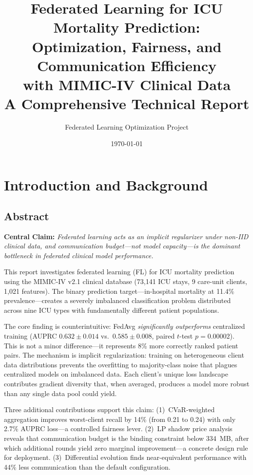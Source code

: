 \documentclass[11pt,a4paper]{report}
\title{\textbf{Federated Learning for ICU Mortality Prediction:\\Optimization, Fairness, and Communication Efficiency\\with MIMIC-IV Clinical Data}\\\vspace{1cm}\large A Comprehensive Technical Report}
\author{Federated Learning Optimization Project}
\date{\today}
\begin{document}
\maketitle
\tableofcontents
\listoffigures
\listoftables

\part{Introduction and Background}

\chapter{Abstract}

\textbf{Central Claim:} \emph{Federated learning acts as an implicit regularizer under non-IID clinical data, and communication budget---not model capacity---is the dominant bottleneck in federated clinical model performance.}

\medskip

This report investigates federated learning (FL) for ICU mortality prediction using the MIMIC-IV v2.1 clinical database (73,141 ICU stays, 9 care-unit clients, 1,021 features). The binary prediction target---in-hospital mortality at 11.4\% prevalence---creates a severely imbalanced classification problem distributed across nine ICU types with fundamentally different patient populations.

The core finding is counterintuitive: FedAvg \emph{significantly outperforms} centralized training (AUPRC $0.632 \pm 0.014$ vs.\ $0.585 \pm 0.008$, paired $t$-test $p = 0.00002$). This is not a minor difference---it represents 8\% more correctly ranked patient pairs. The mechanism is implicit regularization: training on heterogeneous client data distributions prevents the overfitting to majority-class noise that plagues centralized models on imbalanced data. Each client's unique loss landscape contributes gradient diversity that, when averaged, produces a model more robust than any single data pool could yield.

Three additional contributions support this claim: (1)~CVaR-weighted aggregation improves worst-client recall by 14\% (from 0.21 to 0.24) with only 2.7\% AUPRC loss---a controlled fairness lever. (2)~LP shadow price analysis reveals that communication budget is the binding constraint below 334~MB, after which additional rounds yield zero marginal improvement---a concrete design rule for deployment. (3)~Differential evolution finds near-equivalent performance with 44\% less communication than the default configuration.
\end{document}
